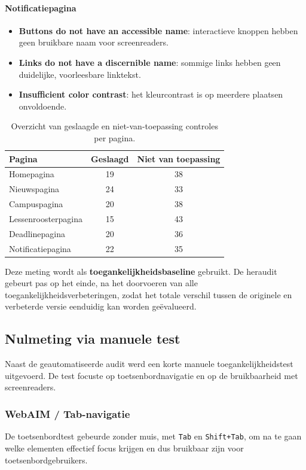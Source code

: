 \paragraph{Notificatiepagina}
\begin{itemize}
\item \textbf{Buttons do not have an accessible name}: interactieve knoppen hebben geen bruikbare naam voor screenreaders.
\item \textbf{Links do not have a discernible name}: sommige links hebben geen duidelijke, voorleesbare linktekst.
\item \textbf{Insufficient color contrast}: het kleurcontrast is op meerdere plaatsen onvoldoende.
\end{itemize}

\begin{table}[h]
\centering
\caption[Auditcontroles per pagina]{Overzicht van geslaagde en niet-van-toepassing controles per pagina.}
\label{tab:toegankelijkheid-controles-per-pagina}
\begin{tabular}{lcc}
\hline
\textbf{Pagina} & \textbf{Geslaagd} & \textbf{Niet van toepassing} \\
\hline
Homepagina & 19 & 38 \\
Nieuwspagina & 24 & 33 \\
Campuspagina & 20 & 38 \\
Lessenroosterpagina & 15 & 43 \\
Deadlinepagina & 20 & 36 \\
Notificatiepagina & 22 & 35 \\
\hline
\end{tabular}
\end{table}

Deze meting wordt als \textbf{toegankelijkheidsbaseline} gebruikt. De heraudit gebeurt pas op het einde, na het doorvoeren van alle toegankelijkheidsverbeteringen, zodat het totale verschil tussen de originele en verbeterde versie eenduidig kan worden geëvalueerd.


\subsection{Nulmeting via manuele test}
\label{subsec:nulmeting-manueel}

Naast de geautomatiseerde audit werd een korte manuele toegankelijkheidstest uitgevoerd. De test focuste op toetsenbordnavigatie en op de bruikbaarheid met screenreaders.

\subsubsection{WebAIM / Tab-navigatie}
De toetsenbordtest gebeurde zonder muis, met \texttt{Tab} en \texttt{Shift+Tab}, om na te gaan welke elementen effectief focus krijgen en dus bruikbaar zijn voor toetsenbordgebruikers.


